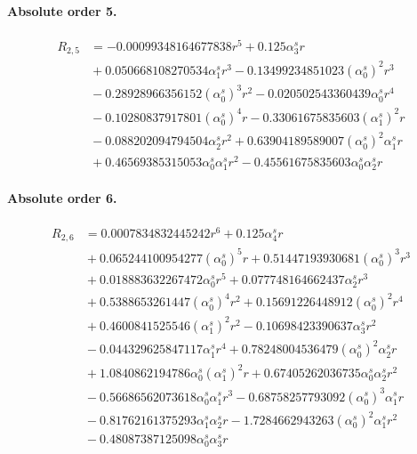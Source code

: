 \documentclass[10pt]{article}
\begin{document}
\paragraph{Absolute order 5.}
\begin{align*}
R_{2,5} &=  - 0.00099348164677838 r^{5} + 0.125 \alpha_{3}^s r \\
&{}  + 0.050668108270534 \alpha_{1}^s r^{3} - 0.13499234851023 \left(\alpha_{0}^s\right)^{2} r^{3} \\
&{}  - 0.28928966356152 \left(\alpha_{0}^s\right)^{3} r^{2} - 0.020502543360439 \alpha_{0}^s r^{4} \\
&{}  - 0.10280837917801 \left(\alpha_{0}^s\right)^{4} r - 0.33061675835603 \left(\alpha_{1}^s\right)^{2} r \\
&{}  - 0.088202094794504 \alpha_{2}^s r^{2} + 0.63904189589007 \left(\alpha_{0}^s\right)^{2} \alpha_{1}^s r \\
&{}  + 0.46569385315053 \alpha_{0}^s \alpha_{1}^s r^{2} - 0.45561675835603 \alpha_{0}^s \alpha_{2}^s r
\end{align*}

\paragraph{Absolute order 6.}
\begin{align*}
R_{2,6} &= 0.0007834832445242 r^{6} + 0.125 \alpha_{4}^s r \\
&{}  + 0.065244100954277 \left(\alpha_{0}^s\right)^{5} r + 0.51447193930681 \left(\alpha_{0}^s\right)^{3} r^{3} \\
&{}  + 0.018883632267472 \alpha_{0}^s r^{5} + 0.077748164662437 \alpha_{2}^s r^{3} \\
&{}  + 0.5388653261447 \left(\alpha_{0}^s\right)^{4} r^{2} + 0.15691226448912 \left(\alpha_{0}^s\right)^{2} r^{4} \\
&{}  + 0.4600841525546 \left(\alpha_{1}^s\right)^{2} r^{2} - 0.10698423390637 \alpha_{3}^s r^{2} \\
&{}  - 0.044329625847117 \alpha_{1}^s r^{4} + 0.78248004536479 \left(\alpha_{0}^s\right)^{2} \alpha_{2}^s r \\
&{}  + 1.0840862194786 \alpha_{0}^s \left(\alpha_{1}^s\right)^{2} r + 0.67405262036735 \alpha_{0}^s \alpha_{2}^s r^{2} \\
&{}  - 0.56686562073618 \alpha_{0}^s \alpha_{1}^s r^{3} - 0.68758257793092 \left(\alpha_{0}^s\right)^{3} \alpha_{1}^s r \\
&{}  - 0.81762161375293 \alpha_{1}^s \alpha_{2}^s r - 1.7284662943263 \left(\alpha_{0}^s\right)^{2} \alpha_{1}^s r^{2} \\
&{}  - 0.48087387125098 \alpha_{0}^s \alpha_{3}^s r
\end{align*}
\end{document}
